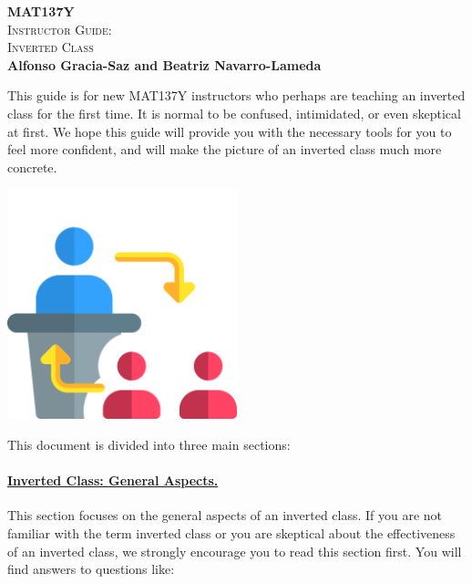 \documentclass[11pt]{article}
\begin{document}
\thispagestyle{empty}
\phantom{.}
\vspace{3cm}
	\begin{center}
		
		
		 { 
		\fontsize{30}{28}\selectfont \textcolor{137cp3}{
		{\bf MAT137Y }}\\[0.5\baselineskip]
		
		{\textcolor{137cp3}{
				{\fontsize{20}{20} \scshape
		Instructor Guide:\\[0.5\baselineskip]
		Inverted Class}}}
		}\\[2\baselineskip]
		
		{\Large \bf
		\textcolor{137cp1}{Alfonso Gracia-Saz and Beatriz Navarro-Lameda}
		}
	\end{center}

\vspace{0.5cm}

\begin{center}
\begin{minipage}{0.7\textwidth}
This guide is for new MAT137Y instructors who perhaps are teaching an inverted class for the first time.  It is normal to be confused, intimidated, or even skeptical at first. We hope this guide will provide you with the necessary tools for you to feel more confident, and will make the picture of an inverted class much more concrete.
\end{minipage}

\vspace{1cm}

\includegraphics[width=0.5\textwidth]{flippedclass}


\end{center}

\newpage

This document is divided into three main sections:


	\paragraph{\hyperref[sec:general]{Inverted Class: General Aspects.}}  This section focuses on the general aspects of an inverted class. 
	If you are not familiar with the term inverted class or you are skeptical about the effectiveness of an inverted class, we strongly encourage you to read this section first.  You will find answers to questions like:
	
\end{document}
